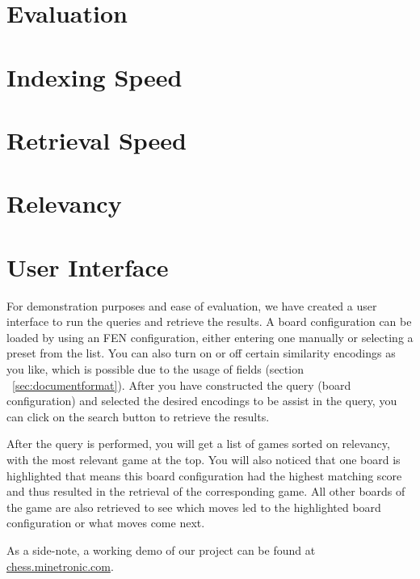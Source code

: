 \documentclass[11pt]{article}
\begin{document}
    \section{Evaluation}


    \section{Indexing Speed}


    \section{Retrieval Speed}


    \section{Relevancy}




    \section{User Interface}

    For demonstration purposes and ease of evaluation, we have created a user interface to run the queries and retrieve the results. A board configuration can be loaded by using an FEN configuration, either entering one manually or selecting a preset from the list. You can also turn on or off certain similarity encodings as you like, which is possible due to the usage of fields (section ~\ref{sec:documentformat}). After you have constructed the query (board configuration) and selected the desired encodings to be assist in the query, you can click on the search button to retrieve the results.

    After the query is performed, you will get a list of games sorted on relevancy, with the most relevant game at the top. You will also noticed that one board is highlighted that means this board configuration had the highest matching score and thus resulted in the retrieval of the corresponding game. All other boards of the game are also retrieved to see which moves led to the highlighted board configuration or what moves come next.

    As a side-note, a working demo of our project can be found at \href{http://chess.minetronic.com}{chess.minetronic.com}.

    

\end{document}
